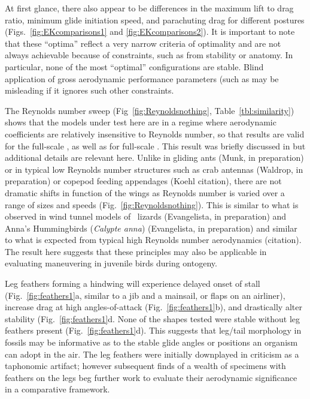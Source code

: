 At first glance, there also appear to be differences in the maximum lift to drag ratio, minimum glide initiation speed, and parachuting drag for different postures (Figs.~\ref{fig:EKcomparisons1} and \ref{fig:EKcomparisons2}). It is important to note that these ``optima'' reflect a very narrow criteria of optimality and are not always achievable because of constraints, such as from stability or anatomy.  In particular, none of the most ``optimal'' configurations are stable.  Blind application of gross aerodynamic performance parameters (such as \citep{Emerson:1990b} may be misleading if it ignores such other constraints.  

The Reynolds number sweep (Fig~\ref{fig:Reynoldsnothing}, Table~\ref{tbl:similarity}) shows that the models under test here are in a regime where aerodynamic coefficients are relatively insensitive to Reynolds number, so that results are valid for the full-scale \Mgui, as well as for full-scale \Archaeopteryx.  This result was briefly discussed in \citep{Koehl:2012} but additional details are relevant here.  Unlike in gliding ants (Munk, in preparation) or in typical low Reynolds number structures such as crab antennas (Waldrop, in preparation) or copepod feeding appendages (Koehl citation), there are not dramatic shifts in function of the wings as Reynolds number is varied over a range of sizes and speeds (Fig.~\ref{fig:Reynoldsnothing}).  This is similar to what is observed in wind tunnel models of \Draco\ lizards (Evangelista, in preparation) and Anna's Hummingbirds (\emph{Calypte anna}) (Evangelista, in preparation) and similar to what is expected from typical high Reynolds number aerodynamics (citation). The result here suggests that these principles may also be applicable in evaluating maneuvering in juvenile birds during ontogeny.  

Leg feathers forming a hindwing will experience delayed onset of stall (Fig.~\ref{fig:feathers1}a, similar to a jib and a mainsail, or flaps on an airliner), increase drag at high angles-of-attack (Fig.~\ref{fig:feathers1}b), and drastically alter stability (Fig.~\ref{fig:feathers1}d.  None of the shapes tested were stable without leg feathers present (Fig.~\ref{fig:feathers1}d).  This suggests that leg/tail morphology in fossils may be informative as to the stable glide angles or positions an organism can adopt in the air. The leg feathers were initially downplayed in criticism as a taphonomic artifact; however subsequent finds of a wealth of specimens with feathers on the legs beg further work to evaluate their aerodynamic significance in a comparative framework. 

